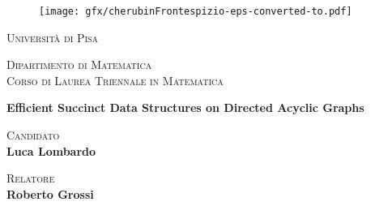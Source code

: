\begin{titlepage}

    \begin{figure}[!htb]
        \centering
        \texttt{[image: gfx/cherubinFrontespizio-eps-converted-to.pdf]}
    \end{figure}

    \begin{center}
        \textcolor[RGB]{2,87,144}{\textsc{\huge Università di Pisa}}\\
        \vspace{10mm}

        \large{\textsc{Dipartimento di Matematica}}\\
        \large{\textsc{Corso di Laurea Triennale in Matematica}}\\
    \end{center}
    \vfill

    \begin{center}
        {\huge{\bfseries Efficient Succinct Data Structures on Directed Acyclic Graphs}}
    \end{center}
    \vfill
    \begin{minipage}[t]{.5\textwidth}
        {\large{\scshape Candidato}{\normalsize\vspace{3mm}
                \bfseries\\ \large{Luca Lombardo}}}
    \end{minipage}
    \hfill
    \begin{minipage}[t]{.5\textwidth}\raggedleft
        {\large{\scshape Relatore}{\normalsize\vspace{3mm}
                \bfseries\\ \large{Roberto Grossi}}}
    \end{minipage}

    \vfill


\end{titlepage}






